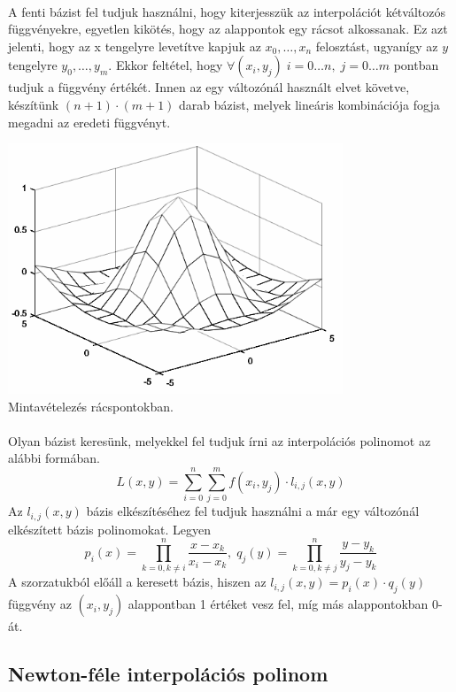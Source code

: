 \documentclass{elteikthesis}
\begin{document}
\paragraph{}
A fenti bázist fel tudjuk használni, hogy kiterjesszük az interpolációt kétváltozós függvényekre, egyetlen kikötés, hogy az alappontok egy rácsot alkossanak. Ez azt jelenti, hogy az x tengelyre levetítve kapjuk az $x_0, \dots, x_n$ felosztást, ugyanígy az $y$ tengelyre $y_0, \dots, y_m$. Ekkor feltétel, hogy $\forall (x_i, y_j) \; i = 0 \dots n, \; j = 0 \dots m$ pontban tudjuk a függvény értékét. Innen az egy változónál használt elvet követve, készítünk $(n+1) \cdot (m+1)$ darab bázist, melyek lineáris kombinációja fogja megadni az eredeti függvényt.
\begin{center}
\includegraphics[width=10cm]{pics/bivariable_grid}\\
{\footnotesize Mintavételezés rácspontokban.}
\end{center}
\paragraph{}
Olyan bázist keresünk, melyekkel fel tudjuk írni az interpolációs polinomot az alábbi formában.
$$
L(x, y) = \sum_{i=0}^{n}\sum_{j=0}^{m}f(x_i, y_j) \cdot l_{i, j}(x, y)
$$
Az $l_{i, j}(x,y)$ bázis elkészítéséhez fel tudjuk használni a már egy változónál elkészített bázis polinomokat. Legyen
$$
p_i(x) = \prod_{k = 0, k \neq i}^{n}\frac{x-x_k}{x_i-x_k},\; q_j(y) = \prod_{k = 0, k \neq j}^{n}\frac{y-y_k}{y_j-y_k}
$$
A szorzatukból előáll a keresett bázis, hiszen az $l_{i, j}(x,y) = p_i(x)\cdot q_j(y)$ függvény az $(x_i, y_j)$ alappontban 1 értéket vesz fel, míg más alappontokban 0-át.
\subsection{Newton-féle interpolációs polinom}
\end{document}
